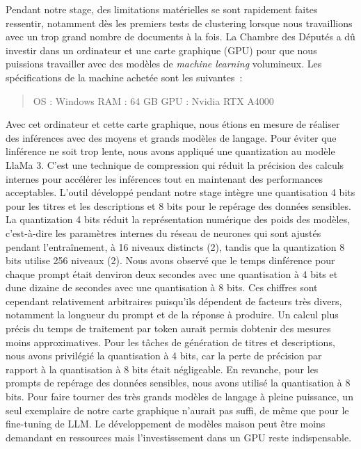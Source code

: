 	
	Pendant notre stage, des limitations matérielles se sont rapidement
	faites ressentir, notamment dès les premiers tests de \gls{clustering}
	lorsque nous travaillions avec un trop grand nombre de documents à la
	fois. La Chambre des Députés a dû investir dans un ordinateur et une
	carte graphique (GPU) pour que nous puissions travailler avec des
	modèles de \emph{machine learning} volumineux. Les spécifications de la machine
	achetée sont les suivantes~:
	\begin{quote}
		OS : Windows\newline
		RAM : 64 GB\newline
		GPU : Nvidia RTX A4000
	\end{quote}
	Avec cet ordinateur et cette carte graphique, nous étions en mesure de
	réaliser des inférences avec des moyens et grands modèles de langage.
	Pour éviter que l\textquotesingle inférence ne soit trop lente, nous
	avons appliqué une \gls{quantization} au modèle LlaMa 3. 
	C'est une technique de compression qui réduit la précision des calculs internes pour accélérer les inférences tout en maintenant des performances acceptables. L'outil développé pendant notre stage intègre une quantisation 4 bits pour les titres et les descriptions et 8 bits pour le repérage des données sensibles. La quantization 4 bits réduit la représentation numérique des poids des modèles, c'est-à-dire les paramètres internes du réseau de neurones qui sont ajustés pendant l'entraînement, à 16 niveaux distincts (2), tandis que la quantization 8 bits utilise 256 niveaux (2).
	Nous avons observé que le temps
	d\textquotesingle inférence pour chaque \gls{prompt} était
	d\textquotesingle environ deux secondes avec une quantisation à 4 bits
	et d\textquotesingle une dizaine de secondes avec une quantisation à 8
	bits. Ces chiffres sont cependant relativement arbitraires puisqu'ils
	dépendent de facteurs très divers, notamment la longueur du prompt et de la
	réponse à produire. Un calcul plus précis du temps de traitement par
	\gls{token} aurait permis d\textquotesingle obtenir des mesures moins
	approximatives. Pour les tâches de génération de titres et descriptions, nous avons
	privilégié la quantisation à 4 bits, car la perte de précision par
	rapport à la quantisation à 8 bits était négligeable. En revanche, pour
	les prompts de repérage des données sensibles, nous avons utilisé la
	quantisation à 8 bits. Pour faire tourner des très grands modèles de
	langage à pleine puissance, un seul exemplaire de notre carte graphique
	n'aurait pas suffi, de même que pour le \gls{fine-tuning} de \gls{LLM}. Le
	développement de modèles maison peut être moins demandant en ressources
	mais l'investissement dans un GPU reste indispensable. 
	
